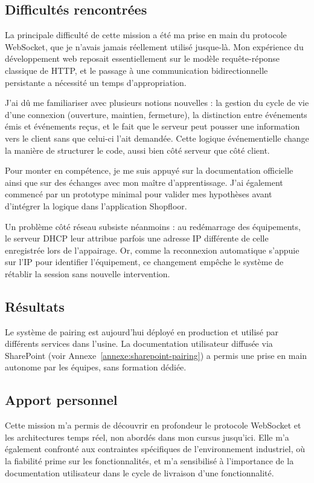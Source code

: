 \documentclass[pe1a]{tnreport} %
\begin{document}
\subsection{Difficultés rencontrées}
La principale difficulté de cette mission a été ma prise en main du 
protocole \gls{WebSocket}, que je n'avais jamais réellement utilisé jusque-là. 
Mon expérience du développement web reposait essentiellement sur le modèle 
requête-réponse classique de HTTP, et le passage à une communication 
bidirectionnelle persistante a nécessité un temps d'appropriation.

J'ai dû me familiariser avec plusieurs notions nouvelles : la gestion du 
cycle de vie d'une connexion (ouverture, maintien, fermeture), la 
distinction entre événements émis et événements reçus, et le fait que le 
serveur peut pousser une information vers le client sans que celui-ci l'ait 
demandée. Cette logique événementielle change la manière de structurer le 
code, aussi bien côté serveur que côté client.

Pour monter en compétence, je me suis appuyé sur la documentation officielle 
ainsi que sur des échanges avec mon maître d'apprentissage. J'ai également 
commencé par un prototype minimal pour valider mes hypothèses avant 
d'intégrer la logique dans l'application Shopfloor.

Un problème côté réseau subsiste néanmoins : au redémarrage des équipements, 
le serveur DHCP leur attribue parfois une adresse IP différente de celle 
enregistrée lors de l'appairage. Or, comme la reconnexion automatique 
s'appuie sur l'IP pour identifier l'équipement, ce changement empêche le 
système de rétablir la session sans nouvelle intervention.

\subsection{Résultats}
Le système de pairing est aujourd'hui déployé en production et utilisé par 
différents services dans l'usine. La 
documentation utilisateur diffusée via SharePoint (voir Annexe~\ref{annexe:sharepoint-pairing}) a permis une prise en main 
autonome par les équipes, sans formation dédiée.

\subsection{Apport personnel}
Cette mission m'a permis de découvrir en profondeur le protocole \gls{WebSocket} 
et les architectures temps réel, non abordés dans mon cursus jusqu'ici. 
Elle m'a également confronté aux contraintes spécifiques de l'environnement 
industriel, où la fiabilité prime sur les fonctionnalités, et m'a sensibilisé 
à l'importance de la documentation utilisateur dans le cycle de livraison 
d'une fonctionnalité.
\end{document}
